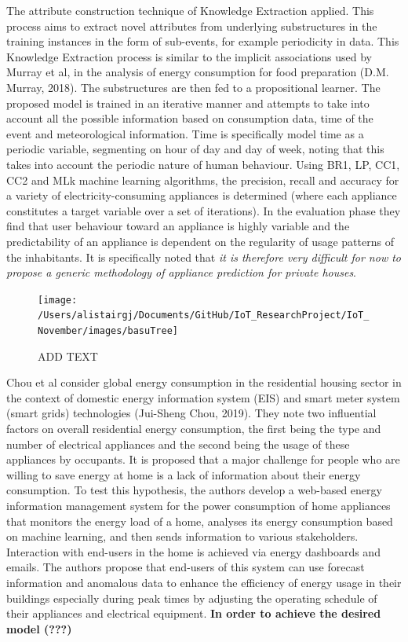 \documentclass[11pt,]{article}
\begin{document}
The attribute construction technique of Knowledge Extraction applied.
This process aims to extract novel attributes from underlying
substructures in the training instances in the form of sub-events, for
example periodicity in data. This Knowledge Extraction process is
similar to the implicit associations used by Murray et al, in the
analysis of energy consumption for food preparation (D.M. Murray, 2018).
The substructures are then fed to a propositional learner. The proposed
model is trained in an iterative manner and attempts to take into
account all the possible information based on consumption data, time of
the event and meteorological information. Time is specifically model
time as a periodic variable, segmenting on hour of day and day of week,
noting that this takes into account the periodic nature of human
behaviour. Using BR1, LP, CC1, CC2 and MLk machine learning algorithms,
the precision, recall and accuracy for a variety of
electricity-consuming appliances is determined (where each appliance
constitutes a target variable over a set of iterations). In the
evaluation phase they find that user behaviour toward an appliance is
highly variable and the predictability of an appliance is dependent on
the regularity of usage patterns of the inhabitants. It is specifically
noted that \emph{it is therefore very difficult for now to propose a
generic methodology of appliance prediction for private houses}.

\begin{figure}[H]

{\centering \texttt{[image: /Users/alistairgj/Documents/GitHub/IoT\_ResearchProject/IoT\_November/images/basuTree]} 

}

\caption{ADD TEXT}\label{fig:unnamed-chunk-8}
\end{figure}

Chou et al consider global energy consumption in the residential housing
sector in the context of domestic energy information system (EIS) and
smart meter system (smart grids) technologies (Jui-Sheng Chou, 2019).
They note two influential factors on overall residential energy
consumption, the first being the type and number of electrical
appliances and the second being the usage of these appliances by
occupants. It is proposed that a major challenge for people who are
willing to save energy at home is a lack of information about their
energy consumption. To test this hypothesis, the authors develop a
web-based energy information management system for the power consumption
of home appliances that monitors the energy load of a home, analyses its
energy consumption based on machine learning, and then sends information
to various stakeholders. Interaction with end-users in the home is
achieved via energy dashboards and emails. The authors propose that
end-users of this system can use forecast information and anomalous data
to enhance the efficiency of energy usage in their buildings especially
during peak times by adjusting the operating schedule of their
appliances and electrical equipment. \textbf{In order to achieve the
desired model (???)}
\end{document}
